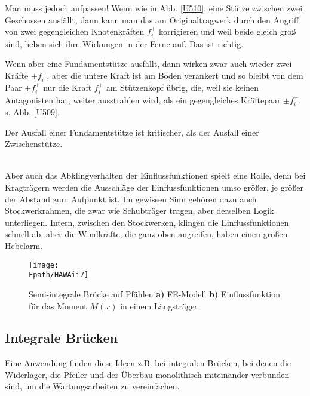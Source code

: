 {{Man muss jedoch aufpassen! Wenn wie in  Abb. \ref{U510},  eine St\"{u}tze zwischen zwei Geschossen ausf\"{a}llt, dann kann man das am Originaltragwerk durch den Angriff von zwei gegengleichen Knotenkr\"{a}ften $f_i^+$ korrigieren und weil beide gleich gro{\ss} sind, heben sich ihre Wirkungen in der Ferne auf. Das ist richtig.

Wenn aber eine Fundamentst\"{u}tze ausf\"{a}llt, dann wirken zwar auch wieder zwei Kr\"{a}fte $\pm f_i^+$, aber die untere Kraft ist am Boden verankert und so bleibt von dem Paar $\pm f_i^+$ nur die Kraft $f_i^+$ am St\"{u}tzenkopf \"{u}brig, die, weil sie keinen Antagonisten hat, weiter ausstrahlen wird, als ein gegengleiches Kr\"{a}ftepaar $\pm f_i^+$, s. Abb. \ref{U509}. \\

\hspace*{-12pt}\colorbox{highlightBlue}{\parbox{0.98\textwidth}{
 Der Ausfall einer Fundamentst\"{u}tze ist kritischer, als der Ausfall einer Zwischenst\"{u}tze.}}\\




Aber auch das Abklingverhalten der Einflussfunktionen spielt eine Rolle, denn bei Kragtr\"{a}gern werden die Ausschl\"{a}ge der Einflussfunktionen umso gr\"{o}{\ss}er, je gr\"{o}{\ss}er der Abstand zum Aufpunkt ist. Im gewissen Sinn geh\"{o}ren dazu auch Stockwerkrahmen, die zwar wie Schubtr\"{a}ger tragen, aber derselben Logik unterliegen. Intern, zwischen den Stockwerken, klingen die Einflussfunktionen schnell ab, aber die Windkr\"{a}fte, die ganz oben angreifen, haben einen gro{\ss}en Hebelarm.

\begin{figure}[tbp]
\centering
\texttt{[image: \\Fpath/HAWAii7]}   %
\caption{Semi-integrale Br\"{u}cke auf Pf\"{a}hlen\textbf{ a)} FE-Modell \textbf{ b)} Einflussfunktion f\"{u}r das Moment $M(x)$ in einem L\"{a}ngstr\"{a}ger}
\label{U461}
\end{figure}%

\textcolor{sectionTitleBlue}{\section{Integrale Br\"{u}cken}}
Eine Anwendung finden diese Ideen z.B. bei integralen Br\"{u}cken, bei denen die Widerlager, die Pfeiler und der \"{U}berbau monolithisch miteinander verbunden sind, um die Wartungsarbeiten zu vereinfachen.

}}
